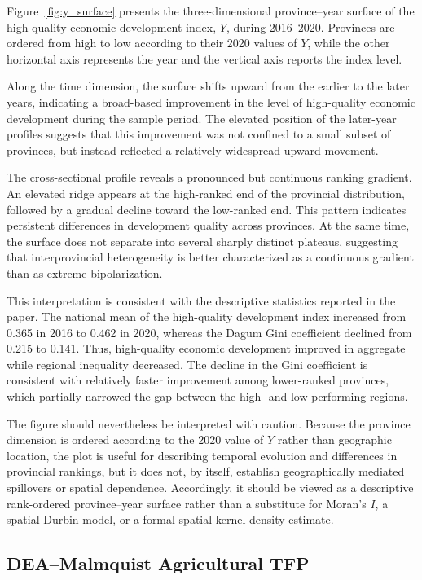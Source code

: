 \documentclass[sustainability,article,submit,moreauthors]{Definitions/mdpi}
\numberwithin{equation}{section}
\begin{document}
Figure~\ref{fig:y_surface} presents the three-dimensional province--year
surface of the high-quality economic development index, $Y$, during
2016--2020. Provinces are ordered from high to low according to their
2020 values of $Y$, while the other horizontal axis represents the year
and the vertical axis reports the index level.

Along the time dimension, the surface shifts upward from the earlier to
the later years, indicating a broad-based improvement in the level of
high-quality economic development during the sample period. The elevated
position of the later-year profiles suggests that this improvement was not
confined to a small subset of provinces, but instead reflected a relatively
widespread upward movement.

The cross-sectional profile reveals a pronounced but continuous ranking
gradient. An elevated ridge appears at the high-ranked end of the
provincial distribution, followed by a gradual decline toward the
low-ranked end. This pattern indicates persistent differences in
development quality across provinces. At the same time, the surface does
not separate into several sharply distinct plateaus, suggesting that
interprovincial heterogeneity is better characterized as a continuous
gradient than as extreme bipolarization.

This interpretation is consistent with the descriptive statistics reported
in the paper. The national mean of the high-quality development index
increased from 0.365 in 2016 to 0.462 in 2020, whereas the Dagum Gini
coefficient declined from 0.215 to 0.141. Thus, high-quality economic
development improved in aggregate while regional inequality decreased.
The decline in the Gini coefficient is consistent with relatively faster
improvement among lower-ranked provinces, which partially narrowed the gap
between the high- and low-performing regions.

The figure should nevertheless be interpreted with caution. Because the
province dimension is ordered according to the 2020 value of $Y$ rather
than geographic location, the plot is useful for describing temporal
evolution and differences in provincial rankings, but it does not, by
itself, establish geographically mediated spillovers or spatial
dependence. Accordingly, it should be viewed as a descriptive
rank-ordered province--year surface rather than a substitute for Moran's
$I$, a spatial Durbin model, or a formal spatial kernel-density estimate.



\subsection{DEA--Malmquist Agricultural TFP}
\end{document}
